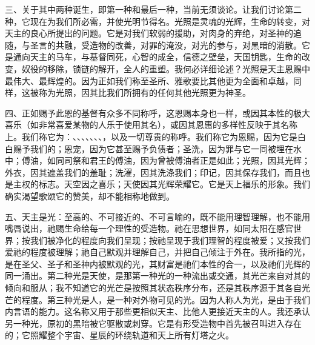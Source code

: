 三、关于其中两种诞生，即第一种和最后一种，当前无须谈论。让我们讨论第二种，它现在为我们所必需，并使光明节得名。光照是灵魂的光辉，生命的转变，对天主的良心所提出的问题。它是对我们软弱的援助，对肉身的弃绝，对圣神的追随，与圣言的共融，受造物的改善，对罪的淹没，对光的参与，对黑暗的消散。它是通向天主的马车，与基督同死，心智的成全，信德之壁垒，天国钥匙，生命的改变，奴役的移除，锁链的解开，全人的重塑。我何必详细论述？光照是天主恩赐中最伟大、最辉煌的。因为正如我们称至圣所、雅歌要比其他更为全面和卓越，同样，这被称为光照，因其比我们所拥有的任何其他光照更为神圣。\par

四、正如赐予此恩的基督有众多不同称呼，这恩赐本身也一样，或因其本性的极大喜乐（如非常喜爱某物的人乐于使用其名），或因其恩惠的多样性反映于其名称上。我们称它为：、、、、、、、，以及一切尊贵的称呼。我们称它为恩赐，因为它是白白赐予我们的；恩宠，因为它甚至赐予负债者；圣洗，因为罪与它一同被埋在水中；傅油，如同司祭和君王的傅油，因为曾被傅油者正是如此；光照，因其光辉；外衣，因其遮盖我们的羞耻；洗濯，因其洗涤我们；印记，因其保存我们，而且也是主权的标志。天空因之喜乐；天使因其光辉荣耀它。它是天上福乐的形象。我们确实渴望歌颂它的赞美，却不能相称地做到。\par

五、天主是光：至高的、不可接近的、不可言喻的，既不能用理智理解，也不能用嘴唇说出，祂赐生命给每一个理性的受造物。祂在思想世界，如同太阳在感官世界；按我们被净化的程度向我们呈现；按祂呈现于我们理智的程度被爱；又按我们爱祂的程度被理解；祂自己默观并理解自己，并把自己倾注于外在。我所指的光，是在圣父、圣子和圣神内被默观的光，其财富是祂们本性的合一，以及祂们光辉的同一涌出。第二种光是天使，是那第一种光的一种流出或交通，其光芒来自对其的倾向和服从；我不知道它的光芒是按照其状态秩序分布，还是其秩序源于其各自光芒的程度。第三种光是人，是一种对外物可见的光。因为人称人为光，是由于我们内言语的能力。这名称又用于那些更相似天主、比他人更接近天主的人。我还承认另一种光，原初的黑暗被它驱散或刺穿。它是有形受造物中首先被召叫进入存在的；它照耀整个宇宙、星辰的环绕轨道和天上所有灯塔之火。\par

